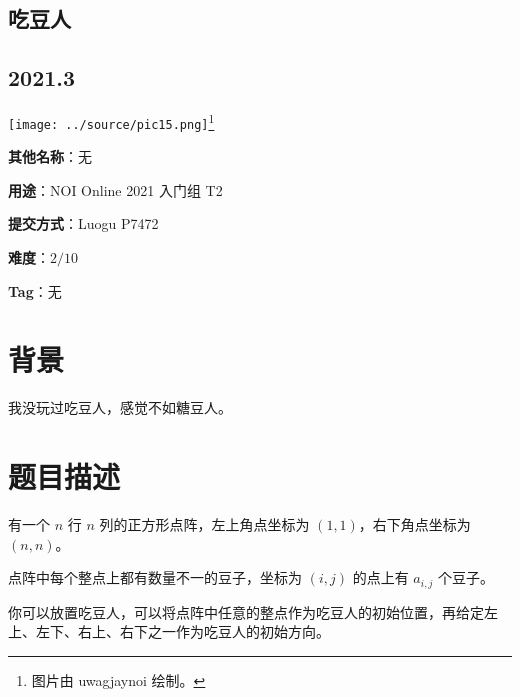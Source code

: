 \documentclass[a4paper,10pt]{article}
\begin{document}
\vspace*{\fill}
\begin{center}

\section{吃豆人}

\subsection*{2021.3}

\vspace{10pt}

\texttt{[image: ../source/pic15.png]}\footnote{图片由 uwagjaynoi 绘制。}

\vspace{10pt}

\textbf{其他名称}：无

\vspace{10pt}

\textbf{用途}：NOI Online 2021 入门组 T2

\vspace{10pt}

\textbf{提交方式}：Luogu P7472

\vspace{10pt}

\textbf{难度}：$2/10$

\vspace{10pt}

\textbf{Tag}：无

\end{center}
\vspace*{\fill}

\newpage

\section*{背景}

我没玩过吃豆人，感觉不如糖豆人。

\section*{题目描述}

有一个 $n$ 行 $n$ 列的正方形点阵，左上角点坐标为 $(1,1)$，右下角点坐标为 $(n,n)$。

点阵中每个整点上都有数量不一的豆子，坐标为 $(i,j)$ 的点上有 $a_{i,j}$ 个豆子。

你可以放置吃豆人，可以将点阵中任意的整点作为吃豆人的初始位置，再给定左上、左下、右上、右下之一作为吃豆人的初始方向。
\end{document}
